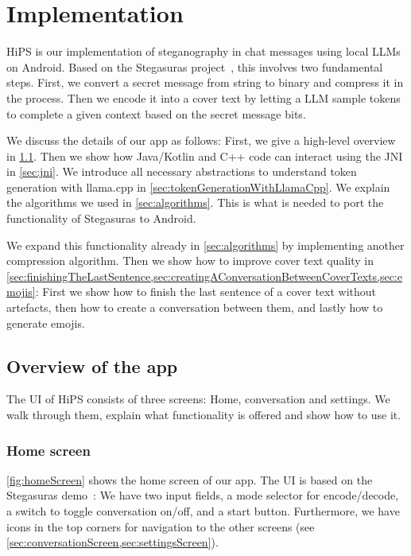 
\chapter{Implementation}\label{ch:implementation}
\glsresetall %

\gls{HiPS} is our implementation of steganography in chat messages using local \glspl{LLM} on Android. Based on the Stegasuras project~\cite{zieglerNeuralLinguisticSteganography2019}, this involves two fundamental steps. First, we convert a secret message from string to binary and compress it in the process. Then we encode it into a cover text by letting a \gls{LLM} sample tokens to complete a given context based on the secret message bits.

We discuss the details of our app as follows: First, we give a high-level overview in \cref{sec:overviewOfTheApp}. Then we show how Java/Kotlin and C++ code can interact using the \gls{JNI} in \cref{sec:jni}. We introduce all necessary abstractions to understand token generation with llama.cpp in \cref{sec:tokenGenerationWithLlamaCpp}. We explain the algorithms we used in \cref{sec:algorithms}. This is what is needed to port the functionality of Stegasuras to Android.

We expand this functionality already in \cref{sec:algorithms} by implementing another compression algorithm. Then we show how to improve cover text quality in \cref{sec:finishingTheLastSentence,sec:creatingAConversationBetweenCoverTexts,sec:emojis}: First we show how to finish the last sentence of a cover text without artefacts, then how to create a conversation between them, and lastly how to generate emojis.

\section{Overview of the app}
\label{sec:overviewOfTheApp}
The \gls{UI} of \gls{HiPS} consists of three screens: Home, conversation and settings. We walk through them, explain what functionality is offered and show how to use it.

\subsection{Home screen}
\label{sec:homeScreen}
\cref{fig:homeScreen} shows the home screen of our app. The \gls{UI} is based on the Stegasuras demo~\cite{zieglerStegasuras2025}: We have two input fields, a mode selector for encode/decode, a switch to toggle conversation on/off, and a start button. Furthermore, we have icons in the top corners for navigation to the other screens (see \cref{sec:conversationScreen,sec:settingsScreen}).

